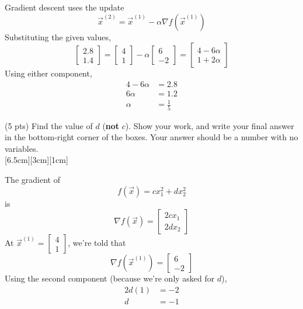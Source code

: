 \documentclass[11pt]{article}
\begin{document}
\begin{prob}[(15 pts)]
\begin{subprob}
\begin{solution}
Gradient descent uses the update
\[
\vec x^{(2)} = \vec x^{(1)} - \alpha \nabla f(\vec x^{(1)})
\]
Substituting the given values,
\[
\begin{bmatrix} 2.8 \\ 1.4 \end{bmatrix}
=
\begin{bmatrix} 4 \\ 1 \end{bmatrix}
-
\alpha
\begin{bmatrix} 6 \\ -2 \end{bmatrix}
=
\begin{bmatrix} 4 - 6\alpha \\ 1 + 2\alpha \end{bmatrix}
\]
Using either component,
\begin{align*}
4 - 6\alpha &= 2.8 \\
6\alpha &= 1.2 \\
\alpha &= \frac{1}{5}
\end{align*}
\end{solution}
\end{subprob}

\begin{subprob}(5 pts)
Find the value of $d$ (\textbf{not} $c$). Show your work, and write your final answer in the bottom-right corner of the boxes. Your answer should be a number with no variables. \\

[6.5cm][3cm][1cm]

\begin{solution}
The gradient of
\[
f(\vec x) = cx_1^2 + dx_2^2
\]
is
\[
\nabla f(\vec x)
=
\begin{bmatrix}
2cx_1 \\
2dx_2
\end{bmatrix}
\]
At $\vec x^{(1)} = \begin{bmatrix} 4 \\ 1 \end{bmatrix}$, we're told that
\[
\nabla f(\vec x^{(1)})
=
\begin{bmatrix} 6 \\ -2 \end{bmatrix}
\]
Using the second component (because we're only asked for $d$),
\begin{align*}
2d(1) &= -2 \\
d &= -1
\end{align*}
\end{solution}


\end{subprob}
\end{prob}
\end{document}
